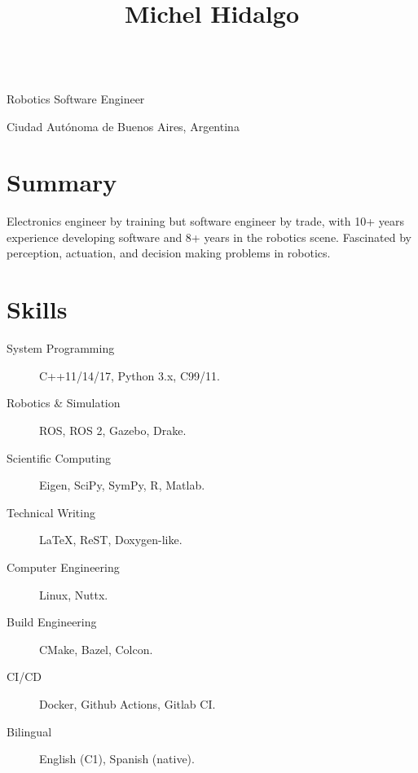 \documentclass[english, letterpaper]{resume}
\begin{document}
\begin{center}
  \title{Michel Hidalgo} \\
  Robotics Software Engineer \\
  \address{Buenos Aires}{
    Ciudad Autónoma de Buenos Aires,
    Argentina} \\
  \begin{inlined}
    \item {}
    \item {}
    \item {}
  \end{inlined}
\end{center}

\section*{Summary}

Electronics engineer by training but software engineer by trade, with 10+ years experience developing software and 8+ years in the robotics scene. Fascinated by perception, actuation, and decision making problems in robotics.

\section*{Skills}

\hfill
\begin{minipage}{0.55\linewidth}
  \begin{description}
    \item[System Programming] C++11/14/17, Python 3.x, C99/11.
    \item[Robotics \& Simulation] ROS, ROS 2, Gazebo, Drake.
    \item[Scientific Computing] Eigen, SciPy, SymPy, R, Matlab.
    \item[Technical Writing] La\TeX, ReST, Doxygen-like.
  \end{description}
\end{minipage}\hfill
\begin{minipage}{0.4\linewidth}
  \begin{description}
    \item[Computer Engineering] Linux, Nuttx.
    \item[Build Engineering] CMake, Bazel, Colcon.
    \item[CI/CD] Docker, Github Actions, Gitlab CI.\@
    \item[Bilingual] English (C1), Spanish (native).
  \end{description}
\end{minipage}
\hfill
\end{document}
